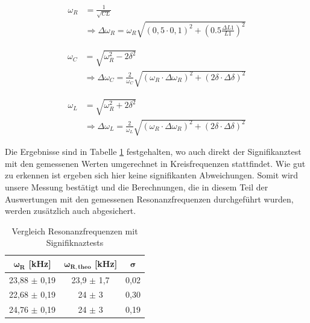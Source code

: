 \documentclass{article}
\begin{document}
\begin{equation}
    \begin{split}
        \omega_R &= \frac{1}{\sqrt{CL}} \\
        &\Rightarrow \Delta \omega_R = \omega_R \sqrt{(0,5 \cdot 0,1)^2 + \left(0.5 \frac{\Delta L1}{L1} \right)^2}
    \end{split}
\end{equation}

\begin{equation}
    \begin{split}
        \omega_C &= \sqrt{\omega_R^2 - 2 \delta^2} \\
        &\Rightarrow \Delta \omega_C = \frac{2}{\omega_C} \sqrt{(\omega_R \cdot \Delta \omega_R)^2 + \left( 2 \delta \cdot \Delta \delta \right)^2}
    \end{split}
\end{equation}

\begin{equation}
    \begin{split}
        \omega_L &= \sqrt{\omega_R^2 + 2 \delta^2} \\
        &\Rightarrow \Delta \omega_L = \frac{2}{\omega_L} \sqrt{(\omega_R \cdot \Delta \omega_R)^2 + \left( 2 \delta \cdot \Delta \delta \right)^2}
    \end{split}
\end{equation}

Die Ergebnisse sind in Tabelle \ref{tab:A6-Vgl_Resonanzfreq} festgehalten, wo auch direkt der Signifikanztest mit den gemessenen Werten umgerechnet in Kreisfrequenzen stattfindet. Wie gut zu erkennen ist ergeben sich hier keine signifikanten Abweichungen. Somit wird unsere Messung bestätigt und die Berechnungen, die in diesem Teil der Auswertungen mit den gemessenen Resonanzfrequenzen durchgeführt wurden, werden zusätzlich auch abgesichert.

\phantom{.}

\begin{table}[!h]
    \centering
    \begin{tabular}{ccc}
        \hline
        $\bm{\omega_R}$ [kHz] & $\bm{\omega_{R,theo}}$ [kHz] & $\bm{\sigma}$  \\ \hline
         23,88 $\pm$ 0,19 & 23,9 $\pm$  1,7  & 0,02 \\
         22,68 $\pm$ 0,19 & 24 $\pm$  3 & 0,30  \\
         24,76 $\pm$ 0,19 & 24 $\pm$  3 & 0,19  \\ \hline
    \end{tabular}%
    \caption{Vergleich Resonanzfrequenzen mit Signifiknaztests}
    \label{tab:A6-Vgl_Resonanzfreq}
\end{table}
\end{document}
